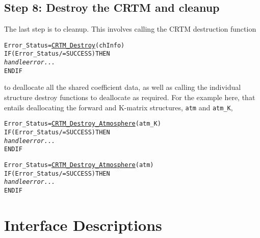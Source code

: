 \subsection{Step 8: Destroy the CRTM and cleanup}
The last step is to cleanup. This involves calling the CRTM destruction function
\begin{alltt}
  Error_Status = \hyperref[sec:CRTM_Destroy_interface]{CRTM_Destroy}( chInfo )
  IF ( Error_Status /= SUCCESS ) THEN 
    \textrm{\textit{handle error...}}
  END IF\end{alltt}
to deallocate all the shared coefficient data, as well as calling the individual structure destroy functions to deallocate as required. For the example here, that entails deallocating the forward and K-matrix \hyperref[sec:atmosphere_structure]{\Atmosphere}  structures, \texttt{atm} and \texttt{atm\_K},
\begin{alltt}
  Error_Status = \hyperref[sec:CRTM_Destroy_Atmosphere_interface]{CRTM_Destroy_Atmosphere}(atm_K)
  IF ( Error_Status /= SUCCESS ) THEN 
    \textrm{\textit{handle error...}}
  END IF
  
  Error_Status = \hyperref[sec:CRTM_Destroy_Atmosphere_interface]{CRTM_Destroy_Atmosphere}(atm)
  IF ( Error_Status /= SUCCESS ) THEN 
    \textrm{\textit{handle error...}}
  END IF\end{alltt}


\section{Interface Descriptions}









